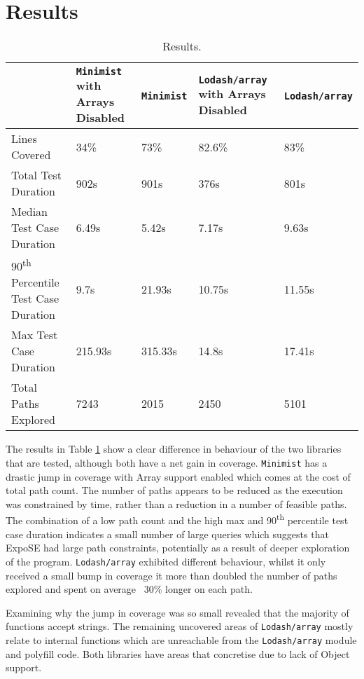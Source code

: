 \documentclass[]{final_report}
\begin{document}
\section{Results}
\begin{table}[t]
\centering
\begin{tabular}{|p{4cm}|p{2cm}|p{2cm}|p{2cm}|p{2cm}|}
\hline
& \lstinline|Minimist| with Arrays Disabled & \lstinline|Minimist| & \lstinline|Lodash/array| with Arrays Disabled & \lstinline|Lodash/array| \\ \hline
Lines Covered & 34\% & 73\% & 82.6\% & 83\% \\ \hline
Total Test Duration & 902s & 901s & 376s & 801s \\ \hline
Median Test Case Duration & 6.49s & 5.42s & 7.17s & 9.63s \\ \hline
90\textsuperscript{th} Percentile Test Case Duration & 9.7s & 21.93s & 10.75s & 11.55s \\ \hline
Max Test Case Duration & 215.93s & 315.33s & 14.8s & 17.41s \\ \hline
Total Paths Explored & 7243 & 2015 & 2450 & 5101 \\ \hline
\end{tabular}
\caption{Results.}
\label{table:results}
\end{table}

The results in Table \ref{table:results} show a clear difference in behaviour of the two libraries that are tested, although both have a net gain in coverage. \lstinline|Minimist| has a drastic jump in coverage with Array support enabled which comes at the cost of total path count. The number of paths appears to be reduced as the execution was constrained by time, rather than a reduction in a number of feasible paths. The combination of a low path count and the high max and 90\textsuperscript{th} percentile test case duration indicates a small number of large queries which suggests that ExpoSE had large path constraints, potentially as a result of deeper exploration of the program. \lstinline|Lodash/array| exhibited different behaviour, whilst it only received a small bump in coverage it more than doubled the number of paths explored and spent on average ~30\% longer on each path. 

Examining why the jump in coverage was so small revealed that the majority of functions accept strings. The remaining uncovered areas of \lstinline|Lodash/array| mostly relate to internal functions which are unreachable from the \lstinline|Lodash/array| module and polyfill code. Both libraries have areas that concretise due to lack of Object support.
\end{document}
